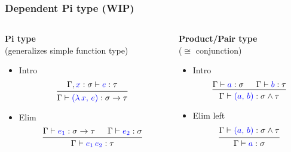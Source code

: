 \documentclass{beamer}
\begin{document}
\begin{frame}
  \frametitle{Dependent Pi type (WIP)}

  \begin{columns}
    \begin{column}{.5\textwidth}
      \textbf{\quad Pi type} \\ \quad (generalizes simple function type)
      \minipage[c][0.6\textheight][s]{\columnwidth}
      \vspace{0.05\textheight}
      \begin{itemize}[label=$\ast$]
      \item Intro
        \[
        \begin{prooftree}
          \hypo{\Gamma, {\color{blue} x} : \sigma \vdash {\color{blue} e} : \tau}
          \infer1{\Gamma \vdash {\color{blue} (\lambda \, x, \, e)} : \sigma \rightarrow \tau}
        \end{prooftree}
        \]

      \item Elim
        \[
        \begin{prooftree}
          \hypo{\Gamma \vdash {\color{blue} e_1} : \sigma \rightarrow \tau}
          \hypo{\Gamma \vdash {\color{blue} e_2} : \sigma}
          \infer2{\Gamma \vdash {\color{blue} e_1 \, e_2} : \tau}
        \end{prooftree}
        \]
      \end{itemize}
      \endminipage
    \end{column}

    \begin{column}{.5\textwidth}
      \textbf{\quad Product/Pair type} \\ \quad ($\cong$ conjunction)
      \minipage[c][0.6\textheight][s]{\columnwidth}
      \vspace{0.05\textheight}
      \begin{itemize}[label=$\ast$]
      \item Intro
      \[
        \begin{prooftree}
          \hypo{\Gamma \vdash {\color{blue} a} : \sigma}
          \hypo{\Gamma \vdash {\color{blue} b} : \tau}
          \infer2{\Gamma \vdash {\color{blue} (a, \, b)} : \sigma \wedge
            \tau }
        \end{prooftree}
      \]

      \item Elim left
      \[
        \begin{prooftree}
          \hypo{\Gamma \vdash {\color{blue} (a, \, b)} : \sigma \wedge
            \tau}
          \infer1{\Gamma \vdash {\color{blue} a} : \sigma}
        \end{prooftree}
      \]


\end{itemize}
\end{column}
\end{columns}
\end{frame}
\end{document}
